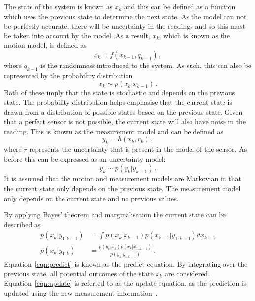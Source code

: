 {The state of the system is known as $x_k$ and
this can be defined as a function which uses the previous state to determine the next
state. As the model can not be perfectly accurate, there will be uncertainty in the
readings and so this must be taken into account by the model. As a result, $x_k$,
which is known as the motion model, is defined as
\begin{equation}
x_{k} = f(x_{k-1}, q_{k-1})\,,
\end{equation}
where $q_{k-1}$ is the randomness introduced to the system. As such, this can
also be represented by the probability distribution
\begin{equation}
x_{k} \sim p(x_{k} | x_{k-1})\,.
\end{equation}
Both of these imply that the state is stochastic and depends on the previous
state. The probability distribution helps emphasise that the current state is
drawn from a distribution of possible states based on the previous state. Given that a perfect sensor is not possible, the current state will also have noise
in the reading. This is known as the measurement model and can be defined as
\begin{equation}
y_{k} = h(x_{k}, r_{k})\,,
\end{equation}
where $r$ represents the uncertainty that is present in the model of the sensor. As
before this can be expressed as an uncertainty model:
\begin{equation}
y_{k} \sim p(y_{k} | y_{k-1})\,.
\end{equation}
It is assumed that the motion and measurement models are Markovian in that
the current state only depends on the previous state. The measurement model only
depends on the current state and no previous values.

By applying Bayes' theorem and marginalisation the current state can be described as
\begin{align}
\label{eqn:predict}
p(x_{k} | y_{1:k-1}) & = \int p(x_{k}|x_{k-1}) p(x_{k-1} | y_{1:k-1}) dx_{k-1} \\
\label{eqn:update}
p(x_{k} | y_{1:k}) &= \frac{ p(y_{k}|x_{k})p(x_{k}|x_{1:k-1})}{ p(y_{k}|y_{1:k-1})}\,.
\end{align}
Equation~\ref{eqn:predict} is known as the predict equation. By integrating over
the previous state, all potential outcomes of the state $x_k$ are
considered. Equation~\ref{eqn:update} is referred to as the update equation,
as the prediction is updated using the new measurement information~\cite{kam1997sensorfusion}.

}
